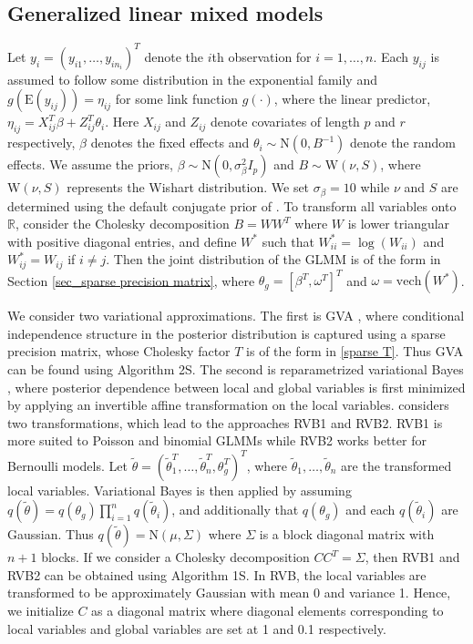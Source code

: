 \documentclass{statsoc}
\newcommand\E{{\text{E}}}
\newcommand\N{{\text{N}}}
\newcommand{\vech}{\text{vech}}
\begin{document}
\subsection{Generalized linear mixed models}
Let $y_i = (y_{i1}, \dots, y_{in_i})^T $ denote the $i$th observation for $i=1, \dots, n$. Each $y_{ij}$ is assumed to follow some distribution in the exponential family and $g(\E(y_{ij})) = \eta_{ij}$ for some link function $g(\cdot)$, where the linear predictor, $\eta_{ij} = X_{ij}^T  \beta + Z_{ij}^T  \theta_i$. Here $X_{ij}$ and $Z_{ij}$ denote covariates of length $p$ and $r$ respectively, $\beta$ denotes the fixed effects and $\theta_i \sim \N(0, B^{-1})$ denote the random effects. We assume the priors, $\beta \sim \N(0, \sigma_\beta^2I_p)$ and $B \sim \text{W}(\nu, S)$, where $\text{W}(\nu, S)$ represents the Wishart distribution. We set $\sigma_\beta = 10$ while $\nu$ and $S$ are determined using the default conjugate prior of \cite{Kass2006}. To transform all variables onto $\mathbb{R}$, consider  the Cholesky decomposition $B = WW^T $ where $W$ is lower triangular with positive diagonal entries, and define $W^*$ such that $W_{ii}^* = \log(W_{ii})$ and $W_{ij}^* = W_{ij}$ if $i \neq j$. Then the joint distribution of the GLMM is of the form in Section \ref{sec_sparse precision matrix}, where $\theta_g = [\beta^T , \omega^T ]^T $ and $\omega = \vech(W^*)$. 

We consider two variational approximations. The first is GVA \citep{Tan2018}, where conditional independence structure in the posterior distribution is captured using a sparse precision matrix, whose Cholesky factor $T$ is of the form in \eqref{sparse T}. Thus GVA can be found using Algorithm 2S. The second is reparametrized variational Bayes \cite[RVB,][]{Tan2021}, where posterior dependence between local and global variables is first minimized by applying an invertible affine transformation on the local variables. \cite{Tan2021} considers two transformations, which lead to the approaches RVB1 and RVB2. RVB1 is more suited to Poisson and binomial GLMMs while RVB2 works better for Bernoulli models. Let $\tilde{\theta} = (\tilde{\theta}_1^T, \dots, \tilde{\theta}_n^T, \theta_g^T)^T $, where $\tilde{\theta}_1, \dots, \tilde{\theta}_n$ are the transformed local variables. Variational Bayes is then applied by assuming $q(\tilde{\theta}) = q(\theta_g) \prod_{i=1}^n q(\tilde{\theta}_i)$, and additionally that $q(\theta_g)$ and each $q(\tilde{\theta}_i)$ are Gaussian. Thus $q(\tilde{\theta}) = \N(\mu, \Sigma)$ where $\Sigma$ is a block diagonal matrix with $n+1$ blocks. If we consider a Cholesky decomposition $CC^T  = \Sigma$, then RVB1 and RVB2 can be obtained using Algorithm 1S. In RVB, the local variables are transformed to be approximately Gaussian with mean 0 and variance 1. Hence, we initialize $C$ as a diagonal matrix where diagonal elements corresponding to local variables and global variables are set at 1 and 0.1 respectively.
\end{document}
